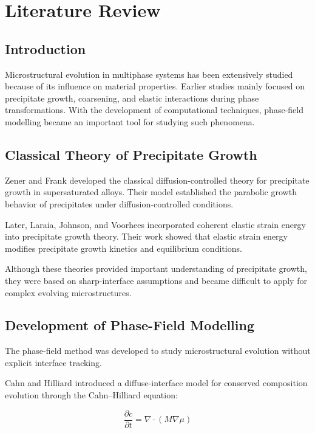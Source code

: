 \chapter{Literature Review}

\section{Introduction}

Microstructural evolution in multiphase systems has been extensively studied because of its influence on material properties. Earlier studies mainly focused on precipitate growth, coarsening, and elastic interactions during phase transformations. With the development of computational techniques, phase-field modelling became an important tool for studying such phenomena.

\section{Classical Theory of Precipitate Growth}

Zener and Frank developed the classical diffusion-controlled theory for precipitate growth in supersaturated alloys. Their model established the parabolic growth behavior of precipitates under diffusion-controlled conditions.

Later, Laraia, Johnson, and Voorhees incorporated coherent elastic strain energy into precipitate growth theory. Their work showed that elastic strain energy modifies precipitate growth kinetics and equilibrium conditions.

Although these theories provided important understanding of precipitate growth, they were based on sharp-interface assumptions and became difficult to apply for complex evolving microstructures.

\section{Development of Phase-Field Modelling}

The phase-field method was developed to study microstructural evolution without explicit interface tracking.

Cahn and Hilliard introduced a diffuse-interface model for conserved composition evolution through the Cahn--Hilliard equation:

\begin{equation}
\frac{\partial c}{\partial t}=\nabla\cdot(M\nabla\mu)
\end{equation}

